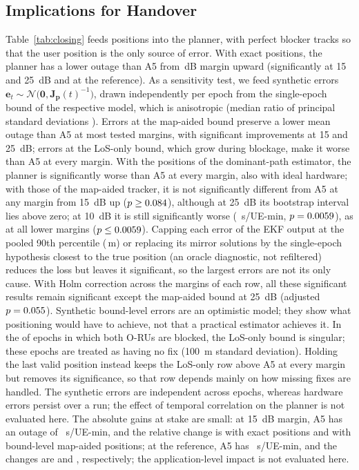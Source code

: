 \documentclass[conference]{IEEEtran}
\begin{document}
\subsection{Implications for Handover}
Table~\ref{tab:closing} feeds positions into the planner, with perfect blocker tracks so that the user position is
the only source of error. With exact positions, the planner has a lower
outage than A5 from \pMarginFifteen\,dB margin upward (significantly at
15 and \SI{25}{dB} and at the reference). As a sensitivity test, we feed
synthetic errors $\mathbf e_t\sim\mathcal N\bigl(\mathbf 0,\mathbf
J_{\mathbf p}(t)^{-1}\bigr)$, drawn independently per epoch from the
single-epoch bound of the respective model, which is anisotropic
(median ratio of principal standard deviations \pAniso). Errors at the
map-aided bound preserve a lower mean outage than A5 at most tested
margins, with significant improvements at 15 and \SI{25}{dB}; errors at
the LoS-only bound, which grow during blockage, make it worse than A5 at
every margin. With the positions of the dominant-path estimator, the
planner is significantly worse than A5 at every margin, also with ideal
hardware; with those of the map-aided tracker, it is not significantly
different from A5 at any margin from \SI{15}{dB} up ($p\ge0.084$),
although at \SI{25}{dB} its bootstrap interval lies above zero; at
\SI{10}{dB} it is still significantly worse (\pCloseTrkTen~s/UE-min,
$p=0.0059$), as at all lower margins ($p\le0.0059$). Capping each error of the EKF output at the
pooled 90th percentile (\pCapPninety\,m) or replacing its mirror
solutions by the single-epoch hypothesis closest to the true position
(an oracle diagnostic, not refiltered) reduces the loss but leaves it
significant, so the largest errors are not its only
cause. With Holm correction across the margins of each row, all these
significant results remain significant except the map-aided bound at
\SI{25}{dB} (adjusted $p=0.055$). Synthetic bound-level errors are an optimistic model; they show what
positioning would have to achieve, not that a practical estimator
achieves it. In the \pDualBlockShare{} of epochs in which both O-RUs are
blocked, the LoS-only bound is singular; these epochs are treated as
having no fix (\SI{100}{m} standard deviation). Holding the last valid
position instead keeps the LoS-only row above A5 at every margin but
removes its significance, so that row depends mainly on how missing
fixes are handled. The synthetic errors are independent
across epochs, whereas hardware errors persist over a run; the effect of
temporal correlation on the planner is not evaluated here. The absolute gains at stake are small: at \SI{15}{dB} margin, A5 has an
outage of \pAfiveFifteen~s/UE-min, and the relative change is
\mbox{\pRelPerfFifteen} with exact positions and \mbox{\pRelMapFifteen} with
bound-level map-aided positions; at the reference, A5 has
\pAfiveRef~s/UE-min, and the changes are \mbox{\pRelPerfRef} and
\mbox{\pRelMapRef}, respectively; the application-level impact is not evaluated here.
\end{document}
